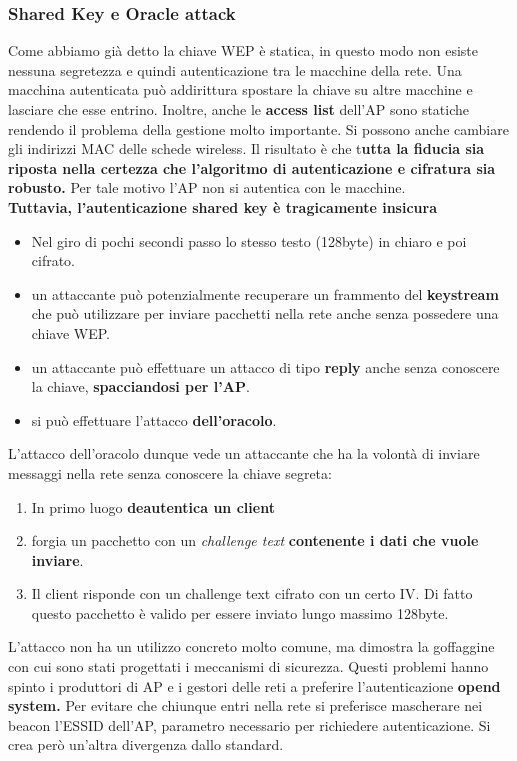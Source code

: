 \documentclass[12pt]{article}
\begin{document}
			\subsubsection{Shared Key e Oracle attack}
				Come abbiamo già detto la chiave WEP è statica, in questo modo non esiste nessuna segretezza e quindi autenticazione tra le macchine della rete. Una macchina autenticata può addirittura spostare la chiave su altre macchine e lasciare che esse entrino. Inoltre, anche le \textbf{access list } dell'AP sono statiche rendendo il problema della gestione molto importante. Si possono anche cambiare gli indirizzi MAC delle schede wireless. Il risultato è che t\textbf{utta la fiducia sia riposta nella certezza che l'algoritmo di autenticazione e cifratura sia robusto.} Per tale motivo l'AP non si autentica con le macchine.\\
				\textbf{Tuttavia, l'autenticazione shared key è tragicamente insicura}
				\begin{itemize}
					\item Nel giro di pochi secondi passo lo stesso testo (128byte) in chiaro e poi cifrato.
					\item un attaccante può potenzialmente recuperare un frammento del \textbf{keystream} che può utilizzare per inviare pacchetti nella rete anche senza possedere una chiave WEP.
					\item un attaccante può effettuare un attacco di tipo \textbf{reply} anche senza conoscere la chiave, \textbf{spacciandosi per l'AP}.
					\item si può effettuare l'attacco \textbf{dell'oracolo}.
				\end{itemize}
			L'attacco dell'oracolo dunque vede un attaccante che ha la volontà di inviare messaggi nella rete senza conoscere la chiave segreta:
			\begin{enumerate}
				\item In primo luogo \textbf{deautentica un client}
				\item forgia un pacchetto con un \textit{challenge text} \textbf{contenente i dati che vuole inviare}.
				\item Il client risponde con un challenge text cifrato con un certo IV. Di fatto questo pacchetto è valido per essere inviato lungo massimo 128byte.
			\end{enumerate}	
			L'attacco non ha un utilizzo concreto molto comune, ma dimostra la goffaggine con cui sono stati progettati i meccanismi di sicurezza.
			Questi problemi hanno spinto i produttori di AP e i gestori delle reti a preferire l'autenticazione \textbf{opend system.} Per evitare che chiunque entri nella rete si preferisce mascherare nei beacon l'ESSID dell'AP, parametro necessario per richiedere autenticazione. 
			Si crea però un'altra divergenza dallo standard.
			
\end{document}
